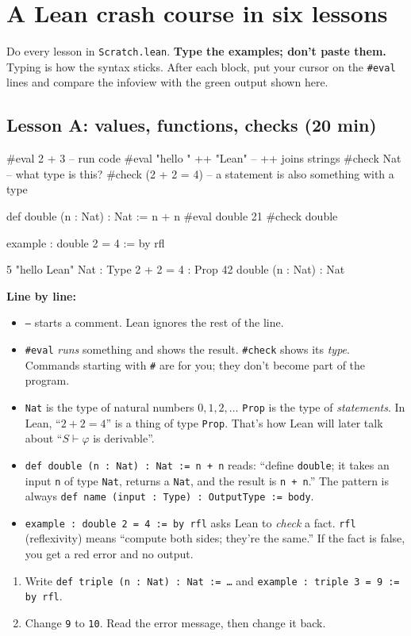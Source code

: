 \documentclass[11pt,a4paper]{article}
\newcommand{\code}[1]{\texttt{#1}}
\begin{document}
\section{A Lean crash course in six lessons}
Do every lesson in \code{Scratch.lean}. \textbf{Type the examples; don't paste them.} Typing is how the syntax sticks. After each block, put your cursor on the \code{\#eval} lines and compare the infoview with the green output shown here.

\subsection{Lesson A: values, functions, checks (20 min)}
\begin{lean}
#eval 2 + 3                        -- run code
#eval "hello " ++ "Lean"           -- ++ joins strings
#check Nat                         -- what type is this?
#check (2 + 2 = 4)                 -- a statement is also something with a type

def double (n : Nat) : Nat := n + n
#eval double 21
#check double

example : double 2 = 4 := by rfl
\end{lean}
\begin{output}
5
"hello Lean"
Nat : Type
2 + 2 = 4 : Prop
42
double (n : Nat) : Nat
\end{output}
\textbf{Line by line:}
\begin{itemize}
\item \code{--} starts a comment. Lean ignores the rest of the line.
\item \code{\#eval} \emph{runs} something and shows the result. \code{\#check} shows its \emph{type}. Commands starting with \code{\#} are for you; they don't become part of the program.
\item \code{Nat} is the type of natural numbers $0,1,2,\dots$ \code{Prop} is the type of \emph{statements}. In Lean, ``$2+2=4$'' is a thing of type \code{Prop}. That's how Lean will later talk about ``$S\vdash\varphi$ is derivable''.
\item \code{def double (n : Nat) : Nat := n + n} reads: ``define \code{double}; it takes an input \code{n} of type \code{Nat}, returns a \code{Nat}, and the result is \code{n + n}.'' The pattern is always \code{def name (input : Type) : OutputType := body}.
\item \code{example : double 2 = 4 := by rfl} asks Lean to \emph{check} a fact. \code{rfl} (reflexivity) means ``compute both sides; they're the same.'' If the fact is false, you get a red error and no output.
\end{itemize}
\begin{try}
\begin{enumerate}
\item Write \code{def triple (n : Nat) : Nat := …} and \code{example : triple 3 = 9 := by rfl}.
\item Change \code{9} to \code{10}. Read the error message, then change it back.
\end{enumerate}
\end{try}
\end{document}
